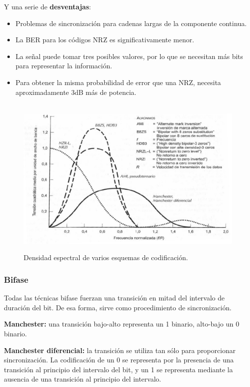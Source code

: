 \documentclass[10pt,a4paper]{article}
\begin{document}
Y una serie de \textbf{desventajas}:
\begin{itemize}
\item Problemas de sincronización para cadenas largas de la componente continua.
\item La BER para los códigos NRZ es significativamente menor.
\item La señal puede tomar tres posibles valores, por lo que se necesitan más bits para representar la información.
\item Para obtener la misma probabilidad de error que una NRZ, necesita aproximadamente 3dB más de potencia.
\end{itemize}

\begin{figure}[ht!]
  \caption{Densidad espectral de varios esquemas de codificación.}
  \label{fig:densidad_espectral}  
  \centering
  \hbox{
	\includegraphics[width=\textwidth-\fboxrule-\fboxrule]{imgs/densidad_espectral.jpg}}
\end{figure}

\subsubsection{Bifase}
Todas las técnicas bifase fuerzan una transición en mitad del intervalo de duración del bit. De esa forma, sirve como procedimiento de sincronización.

\begin{description}
\item \textbf{Manchester:} una transición bajo-alto representa un 1 binario, alto-bajo un 0 binario.
\item \textbf{Manchester diferencial:} la transición se utiliza tan sólo para proporcionar sincronización. La codificación de un 0 se representa por la presencia de una transición al principio del intervalo del bit, y un 1 se representa mediante la ausencia de una transición al principio del intervalo.
\end{description}
\end{document}
